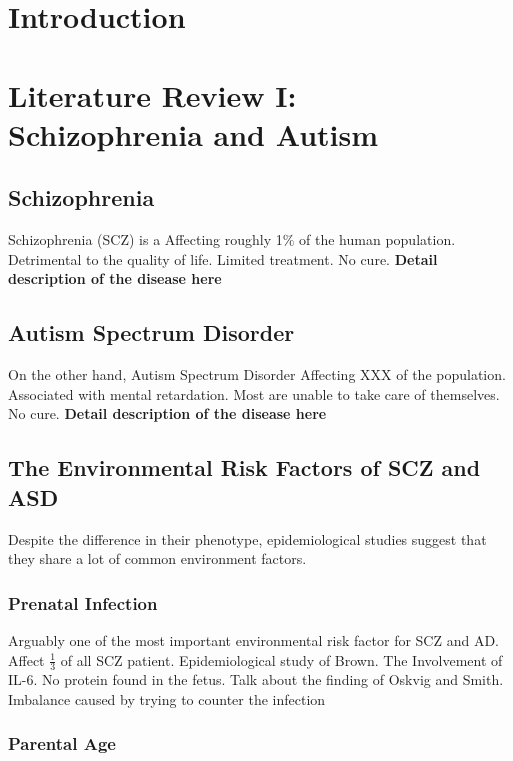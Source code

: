 \documentclass{book}
\begin{document}
	\cleardoublepage
	\begin{singlespace}
		\tableofcontents
	\end{singlespace}
\mainmatter
	\chapter*{Introduction}\pagestyle{fancy}
	\chapter[Literature Review I: Schizophrenia and Autism]{Literature Review I:\\ Schizophrenia and Autism}
		\section{Schizophrenia}
			Schizophrenia (SCZ) is a %
			Affecting  roughly 1$\%$ of the human population.
			Detrimental to the quality of life.
			Limited treatment.
			No cure.
			\textbf{Detail description of the disease here}
		\section{Autism Spectrum Disorder}
			On the other hand, Autism Spectrum Disorder
			Affecting XXX of the population.
			Associated with mental retardation.
			Most are unable to take care of themselves.
			No cure.
			\textbf{Detail description of the disease here}
		\section{The Environmental Risk Factors of SCZ and ASD}
			Despite the difference in their phenotype, epidemiological studies suggest that they share a lot of common environment factors.
			\subsection{Prenatal Infection}
			Arguably one of the most important environmental risk factor for SCZ and AD. 
			Affect $\frac{1}{3}$ of all SCZ patient.
			Epidemiological study of Brown.
			The Involvement of IL-6.
			No protein found in the fetus.
			Talk about the finding of Oskvig and Smith.
			Imbalance caused by trying to counter the infection
			\subsection{Parental Age}
\end{document}

